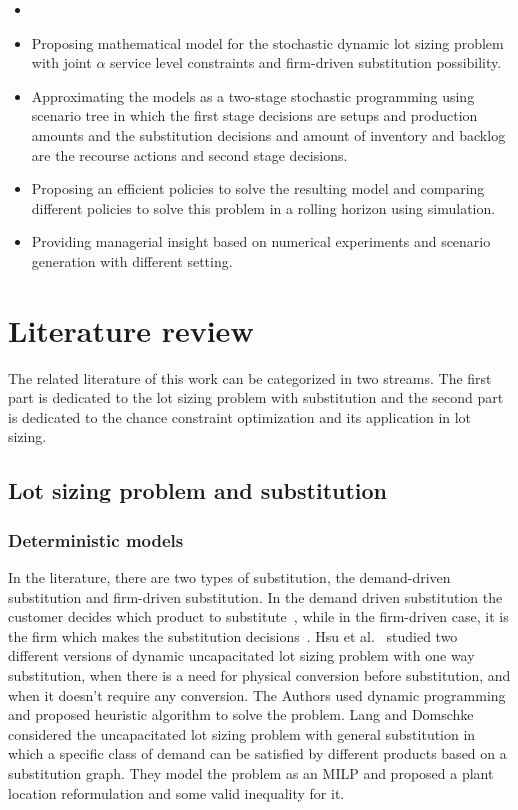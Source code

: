 \documentclass[10pt]{article}
\begin{document}
    
\begin{itemize}
\item   
\item Proposing mathematical model for the stochastic dynamic lot sizing problem with joint $\alpha$ service level constraints and firm-driven substitution possibility.
\item Approximating the models as a two-stage stochastic programming using scenario tree in which the first stage decisions are setups and production amounts and the substitution decisions and amount of inventory and backlog are the recourse actions and second stage decisions.
    \item Proposing an efficient policies to solve the resulting model and comparing different policies to solve this problem in a rolling horizon using simulation.
    \item Providing managerial insight based on numerical experiments and scenario generation with different setting.%
    


\end{itemize}

\section{Literature review}
The related literature of this work can be categorized in two streams. The first part is dedicated to the lot sizing problem with substitution and the second part is dedicated to the chance constraint optimization and its application in lot sizing.

\subsection{Lot sizing problem and substitution}
\subsubsection{Deterministic models}
In the literature, there are two types of substitution, the demand-driven substitution and firm-driven substitution. In the demand driven substitution the customer decides which product to substitute~\cite{zeppetella2017optimal}, while in the firm-driven case, it is the firm which makes the substitution decisions~\cite{rao2004multi}. Hsu et al.~\cite{hsu2005dynamic} studied two different versions of dynamic uncapacitated lot sizing problem with one way substitution, when there is a need for physical conversion before substitution, and when it doesn't require any conversion. The Authors used dynamic programming and proposed heuristic algorithm to solve the problem.  Lang and Domschke~\cite{lang2010efficient} considered the uncapacitated lot sizing problem with general substitution in which a specific class of demand can be satisfied by different products based on a substitution graph. They model the problem as an MILP and proposed a plant location reformulation and some valid inequality for it.
\end{document}
